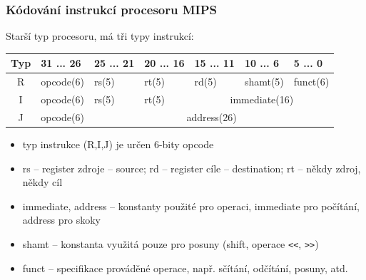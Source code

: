 \begin{frame}
\frametitle{Kódování instrukcí procesoru MIPS}

Starší typ procesoru, má tři typy instrukcí:

\begin{tabular}{|c|l|l|l|l|l|l|}\hline
Typ & 31 ... 26 & 25 ... 21 & 20 ... 16 & 15 ... 11 & 10 ... 6 & 5 ... 0 \\ \hline
R & opcode(6) & rs(5) & rt(5) & rd(5) & shamt(5) & funct(6) \\ \hline
I & opcode(6) & rs(5) & rt(5) & \multicolumn{3}{c|}{ immediate(16)} \\ \hline
J & opcode(6) & \multicolumn{5}{c|}{ address(26)} \\ \hline
\end{tabular}

\begin{itemize}
\item typ instrukce (R,I,J) je určen 6-bity opcode
\item rs -- register zdroje -- source; rd -- register cíle -- destination; rt -- někdy zdroj, někdy cíl
\item immediate, address -- konstanty použité pro operaci, immediate pro počítání, address pro skoky 
\item shamt -- konstanta využitá pouze pro posuny (shift, operace \texttt{<<}, \texttt{>>})
\item funct -- specifikace prováděné operace, např. sčítání, odčítání, posuny, atd.
\end{itemize}

\end{frame}
